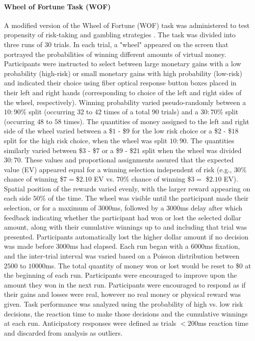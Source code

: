 \documentclass[utf8]{stylesheet}
\begin{document}
\paragraph{Wheel of Fortune Task (WOF)} A modified version of the Wheel of Fortune (WOF) task was administered to test propensity of risk-taking and gambling strategies \citep{ernst2004wheeloffortune}. The task was divided into three runs of 30 trials. In each trial, a "wheel" appeared on the screen that portrayed the probabilities of winning different amounts of virtual money. Participants were instructed to select between large monetary gains with a low probability (high-risk) or small monetary gains with high probability (low-risk) and indicated their choice using fiber optical response button boxes placed in their left and right hands (corresponding to choice of the left and right sides of the wheel, respectively). Winning probability varied pseudo-randomly between a $10:90\%$ split (occurring $32$ to $42$ times of a total $90$ trials) and a $30:70\%$ split (occurring $48$ to $58$ times). The quantities of money assigned to the left and right side of the wheel varied between a \$$1$ - \$$9$ for the low risk choice or a \$$2$ - \$$18$ split for the high risk choice, when the wheel was split $10:90$. The quantities similarly varied between \$$3$ - \$$7$ or a \$$9$ - \$$21$ split when the wheel was divided $30:70$.  These values and proportional assignments assured that the expected value (EV) appeared equal for a winning selection independent of risk (e.g., $30\%$ chance of winning \$$7 = $\$$2.10$ EV vs. $70\%$ chance of winning \$$3 =$ \$$2.10$ EV).  Spatial position of the rewards varied evenly, with the larger reward appearing on each side $50\%$ of the time.  The wheel was visible until the participant made their selection, or for a maximum of $3000$ms, followed by a $3000$ms delay after which feedback indicating whether the participant had won or lost the selected dollar amount, along with their cumulative winnings up to and including that trial was presented.  Participants automatically lost the higher dollar amount if no decision was made before $3000$ms had elapsed.  Each run began with a $6000$ms fixation, and the inter-trial interval was varied based on a Poisson distribution between $2500$ to $10000$ms. The total quantity of money won or lost would be reset to \$$0$ at the beginning of each run. Participants were encouraged to improve upon the amount they won in the next run.  Participants were encouraged to respond as if their gains and losses were real, however no real money or physical reward was given. Task performance was analyzed using the probability of high vs. low risk decisions, the reaction time to make those decisions and the cumulative winnings at each run. Anticipatory responses were defined as trials $<200$ms reaction time and discarded from analysis as outliers.
\end{document}
